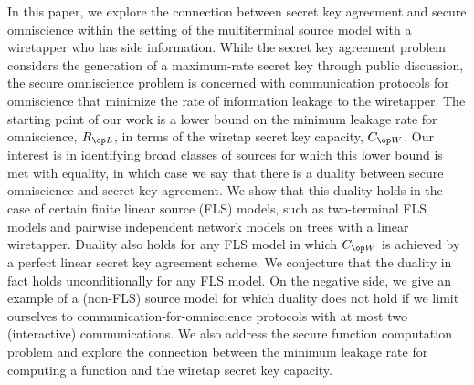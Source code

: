   In this paper, we explore the connection between secret key agreement and secure omniscience within the setting of the multiterminal source model with a wiretapper who has side information. While the secret key agreement problem considers the generation of a maximum-rate secret key through public discussion, the secure omniscience problem is concerned with communication protocols for omniscience that minimize the rate of information leakage to the wiretapper. The starting point of our work is a lower bound on the minimum leakage rate for omniscience, $\rl$, in terms of the wiretap secret key capacity, $\wskc$. Our interest is in identifying broad classes of sources for which this lower bound is met with equality, in which case we say that there is a duality between secure omniscience and secret key agreement. We show that this duality holds in the case of certain finite linear source (FLS) models, such as two-terminal FLS models and pairwise independent network models on trees with a linear wiretapper. Duality also holds for any FLS model in which $\wskc$ is achieved by a perfect linear secret key agreement scheme. We conjecture that the duality in fact holds unconditionally for any FLS model. On the negative side, we give an example of a (non-FLS) source model for which duality does not hold if we limit ourselves to communication-for-omniscience protocols with at most two (interactive) communications.  We also address the secure function computation problem and explore the connection between the minimum leakage rate for computing a function and the wiretap secret key capacity.
  
  
